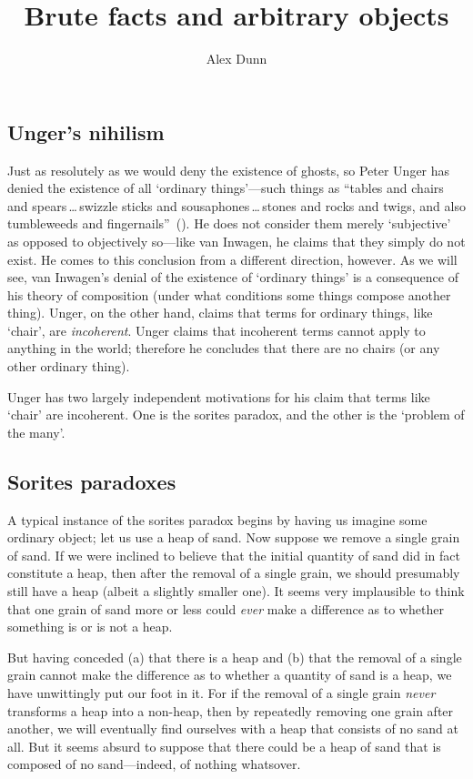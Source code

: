 \documentclass[11pt]{standalone} \newif\ifstandlone \standalonetrue
\title{Brute facts and arbitrary objects}
\author{Alex Dunn}
\begin{document}
\ifstandalone
\maketitle
\begin{spacing}{1.5}
\fi

\section{Unger's nihilism}
\label{unger}
Just as resolutely as we would deny the existence of ghosts, so Peter
Unger has denied the existence of all `ordinary things'---such things
as ``tables and chairs and spears\,\ldots\,swizzle sticks and
sousaphones\,\ldots\,stones and rocks and twigs, and also tumbleweeds
and fingernails''~(\citeyear[117]{unger1979}).  He does not consider
them merely `subjective' as opposed to objectively so---like van
Inwagen, he claims that they simply do not exist.  He comes to this
conclusion from a different direction, however.  As we will see, van
Inwagen's denial of the existence of `ordinary things' is a
consequence of his theory of composition (under what conditions some
things compose another thing).  Unger, on the other hand, claims that
terms for ordinary things, like `chair', are {\em incoherent}.  Unger
claims that incoherent terms cannot apply to anything in the world;
therefore he concludes that there are no chairs (or any other ordinary
thing).

Unger has two largely independent motivations for his claim that terms
like `chair' are incoherent.  One is the sorites paradox, and the
other is the `problem of the many'.

\subsection{Sorites paradoxes}
\label{sorites}
A typical instance of the sorites paradox begins by having us imagine
some ordinary object; let us use a heap of sand.  Now suppose we
remove a single grain of sand.  If we were inclined to believe that
the initial quantity of sand did in fact constitute a heap, then after
the removal of a single grain, we should presumably still have a heap
(albeit a slightly smaller one).  It seems very implausible to think
that one grain of sand more or less could {\em ever} make a difference
as to whether something is or is not a heap.

But having conceded (a) that there is a heap and (b) that the removal
of a single grain cannot make the difference as to whether a quantity
of sand is a heap, we have unwittingly put our foot in it.  For if the
removal of a single grain {\em never} transforms a heap into a
non-heap, then by repeatedly removing one grain after another, we will
eventually find ourselves with a heap that consists of no sand at
all.  But it seems absurd to suppose that there could be a heap of
sand that is composed of no sand---indeed, of nothing whatsover.


\end{spacing}
\end{document}
